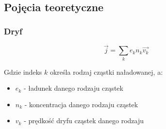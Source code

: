 \documentclass[10pt,a4paper]{article}
\begin{document}
\subsection{Pojęcia teoretyczne}

\subsubsection{Dryf}


\begin{equation*}
    \vec{j} = \sum_{k}{e_k n_k \vec{v_k}}
\end{equation*}

Gdzie indeks $k$ określa rodzaj cząstki naładowanej, a:
\begin{itemize}
    \item $e_k$ - ładunek danego  rodzaju cząstek
    \item $n_k$ - koncentracja danego rodzaju cząstek
    \item $v_k$ - prędkość dryfu cząstek danego rodzaju
\end{itemize}




\end{document}
